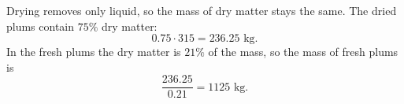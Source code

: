 Drying removes only liquid, so the mass of dry matter stays the same. The dried plums contain $75\%$ dry matter:
\[
0.75\cdot315=236.25\text{ kg}.
\]
In the fresh plums the dry matter is $21\%$ of the mass, so the mass of fresh plums is
\[
\dfrac{236.25}{0.21}=\boxed{1125}\text{ kg}.
\]
